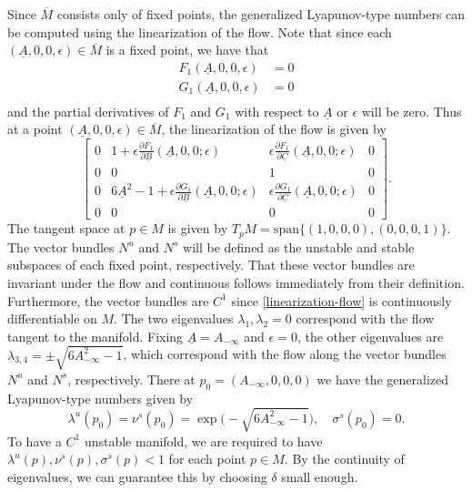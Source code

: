 Since \(\overline M\) consists only of fixed points, the generalized Lyapunov-type numbers can be computed using the linearization of the flow. Note that since each \((\underline A, 0, 0,\epsilon) \in \overline M\) is a fixed point, we have that
\begin{equation}
	\begin{aligned}
		F_1(\underline A, 0, 0, \epsilon) &= 0 \\
		G_1(\underline A, 0, 0, \epsilon) &= 0 \\
	\end{aligned}
\end{equation}
and the partial derivatives of \(F_1\) and \(G_1\) with respect to \(\underline A\) or \(\epsilon\) will be zero. Thus at a point \((\underline A, 0, 0, \epsilon) \in\overline M\), the linearization of the flow is given by
\begin{equation}\label{linearization-flow}
	\begin{bmatrix}
		0 & 1 + \epsilon \frac{\partial F_1}{\partial \underline B}(\underline A, 0, 0; \epsilon) & \epsilon \frac{\partial F_1}{\partial \underline C}(\underline A, 0, 0;\epsilon) & 0 \\
		0 & 0 & 1 & 0 \\
		0 & 6\underline A ^2 - 1 + \epsilon \frac{\partial G_1}{\partial \underline B}(\underline A, 0, 0; \epsilon) & \epsilon \frac{\partial G_1}{\partial \underline C}(\underline A, 0, 0; \epsilon) & 0 \\
		0 & 0 & 0 & 0
	\end{bmatrix}.
\end{equation}
The tangent space at \(p\in M\) is given by \(T_p M = \mathrm{span}\{(1,0,0,0), (0,0,0,1)\}\). The vector bundles \(N^u\) and \(N^s\) will be defined as the unstable and stable subspaces of each fixed point, respectively. That these vector bundles are invariant under the flow and continuous follows immediately from their definition. Furthermore, the vector bundles are \(C^1\) since \cref{linearization-flow} is continuously differentiable on \(M\). The two eigenvalues \(\lambda_1,\lambda_2=0\) correspond with the flow tangent to the manifold. Fixing \(\underline A = A_{-\infty}\) and \(\epsilon = 0\), the other eigenvalues are \(\lambda_{3,4} = \pm \sqrt{6A_{-\infty}^2-1}\), which correspond with the flow along the vector bundles \(N^u\) and \(N^s\), respectively. There at \(p_0 =(A_{-\infty}, 0, 0, 0)\)  we have the generalized Lyapunov-type numbers given by
\begin{equation}
	\lambda^u(p_0) = \nu^s(p_0) = \exp\big(-\sqrt{6A_{-\infty}^2-1}\big), \quad \sigma^s(p_0) = 0.
\end{equation}
To have a \(C^1\) unstable manifold, we are required to have \(\lambda^u(p), \nu^s(p), \sigma^s(p)  < 1\)  for each point \(p\in M\). By the continuity of eigenvalues, we can guarantee this by choosing \(\delta\) small enough. 

